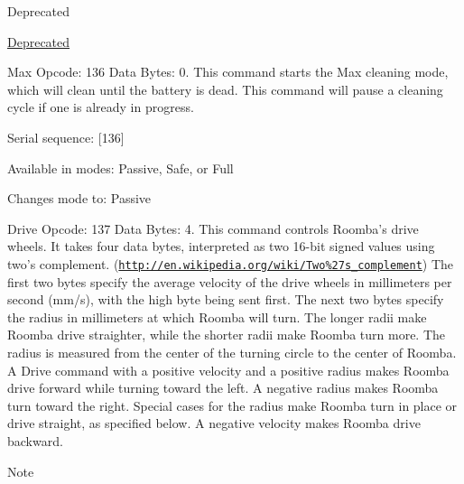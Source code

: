 \begin{Desc}
\begin{description}
\begin{DoxyRefDesc}{Deprecated}
\item[\hyperlink{deprecated__deprecated000002}{Deprecated}]\end{DoxyRefDesc}
\item[{\em 
\hypertarget{group__roomba-lib_gga305e17dfb7050ad83ea49ded2e6a2e24a8dbcf646bf6f314d1d9109cb233e9768}{}R\+O\+O\+M\+B\+A\+\_\+\+M\+A\+X\label{group__roomba-lib_gga305e17dfb7050ad83ea49ded2e6a2e24a8dbcf646bf6f314d1d9109cb233e9768}
}]Max Opcode\+: 136 Data Bytes\+: 0. This command starts the Max cleaning mode, which will clean until the battery is dead. This command will pause a cleaning cycle if one is already in progress.
\begin{DoxyItemize}
\item Serial sequence\+: \mbox{[}136\mbox{]}
\item Available in modes\+: Passive, Safe, or Full
\item Changes mode to\+: Passive 
\end{DoxyItemize}\item[{\em 
\hypertarget{group__roomba-lib_gga305e17dfb7050ad83ea49ded2e6a2e24aaf858c1a076d79bae24353fe65a5f1ae}{}R\+O\+O\+M\+B\+A\+\_\+\+D\+R\+I\+V\+E\label{group__roomba-lib_gga305e17dfb7050ad83ea49ded2e6a2e24aaf858c1a076d79bae24353fe65a5f1ae}
}]Drive Opcode\+: 137 Data Bytes\+: 4. This command controls Roomba’s drive wheels. It takes four data bytes, interpreted as two 16-\/bit signed values using two’s complement. (\href{http://en.wikipedia.org/wiki/Two%27s_complement}{\tt http\+://en.\+wikipedia.\+org/wiki/\+Two\%27s\+\_\+complement}) The first two bytes specify the average velocity of the drive wheels in millimeters per second (mm/s), with the high byte being sent first. The next two bytes specify the radius in millimeters at which Roomba will turn. The longer radii make Roomba drive straighter, while the shorter radii make Roomba turn more. The radius is measured from the center of the turning circle to the center of Roomba. A Drive command with a positive velocity and a positive radius makes Roomba drive forward while turning toward the left. A negative radius makes Roomba turn toward the right. Special cases for the radius make Roomba turn in place or drive straight, as specified below. A negative velocity makes Roomba drive backward. \begin{DoxyNote}{Note}

\end{DoxyNote}
\end{description}
\end{Desc}
